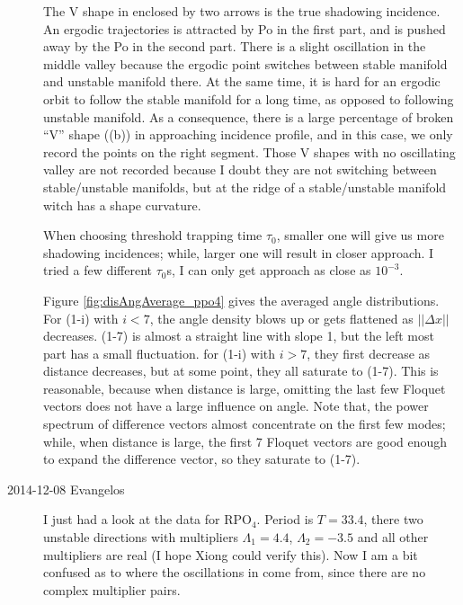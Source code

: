 \begin{description}
The V shape in  enclosed by two arrows
is the true shadowing incidence. An ergodic trajectories is attracted
by Po in the first part, and is pushed away by the Po in the second part.
There is a slight oscillation in the middle
valley because the ergodic point switches between stable manifold and unstable
manifold there. At the same time, it is hard for an ergodic orbit
to follow the stable manifold for a long time, as opposed to following
unstable manifold. As a consequence, there is a large percentage
of broken ``V'' shape ((b)) in approaching incidence
profile, and in this case, we only record the points on the right segment.
Those V shapes with no oscillating valley are not recorded because I doubt
they are not switching between stable/unstable manifolds, but at the ridge
of a stable/unstable manifold witch has a shape curvature.

When choosing threshold trapping time $\tau_0$, smaller one will give us
more shadowing incidences; while, larger one will result in closer
approach. I tried a few different $\tau_0$s, I can only get approach as close
as $10^{-3}$.

Figure \ref{fig:disAngAverage_ppo4} gives the averaged angle distributions.
For (1-i) with $i < 7$, the angle density blows up or gets flattened as
$||\Delta x||$ decreases. (1-7) is almost a straight line with slope 1, but
the left most part has a small fluctuation. for (1-i) with $i>7$, they first
decrease as distance decreases, but at some point, they all saturate to
(1-7). This is reasonable, because when distance is large, omitting the last
few Floquet vectors does not have a large influence on angle. Note that, the
power spectrum of difference vectors almost concentrate on the first few
modes; while, when distance is large, the first 7 Floquet vectors are good
enough to expand the difference vector, so they saturate to (1-7).

\item[2014-12-08 Evangelos] I just had a look at the data for RPO$_4$. Period is
$T=33.4$, there two unstable directions with multipliers $\Lambda_1=4.4$, $\Lambda_2=-3.5$
and all other multipliers are real (I hope Xiong could verify this). Now I am a bit
confused as to where the oscillations in  come from,
since there are no complex multiplier pairs.


\end{description}
